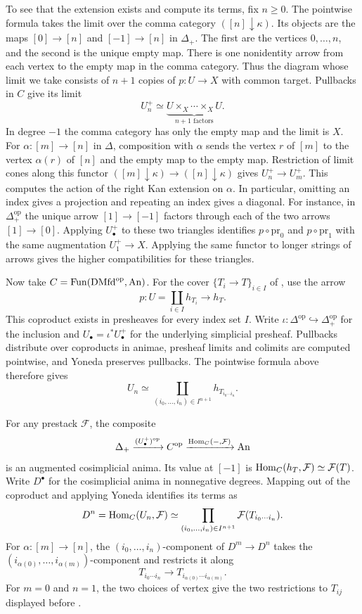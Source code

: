 To see that the extension exists and compute its terms, fix $n\geq0$.
The pointwise formula takes the limit over the comma category
$([n]\downarrow\kappa)$. Its objects are the maps $[0]\to[n]$ and
$[-1]\to[n]$ in $\Delta_+$. The first are the vertices $0,\ldots,n$,
and the second is the unique empty map. There is one nonidentity
arrow from each vertex to the empty map in the comma category.
Thus the diagram whose limit we take consists of $n+1$ copies of
$p\colon U\to X$ with common target. Pullbacks in $C$ give its limit
\[
 U_n^+\simeq\underbrace{U\times_X\cdots\times_X U}_{n+1\text{ factors}}.
\]
In degree $-1$ the comma category has only the empty map and the
limit is $X$. For $\alpha\colon[m]\to[n]$ in $\Delta$, composition
with $\alpha$ sends the vertex $r$ of $[m]$ to the vertex $\alpha(r)$
of $[n]$ and the empty map to the empty map. Restriction of limit
cones along this functor $([m]\downarrow\kappa)\to([n]\downarrow\kappa)$
gives $U_n^+\to U_m^+$. This computes the action of the right Kan
extension on $\alpha$. In particular, omitting an index gives a
projection and repeating an index gives a diagonal. For instance,
in $\Delta_+^{\mathrm{op}}$ the unique arrow $[1]\to[-1]$ factors through
each of the two arrows $[1]\to[0]$. Applying $U^+_\bullet$ to these
two triangles identifies $p\circ\mathrm{pr}_0$ and
$p\circ\mathrm{pr}_1$ with the same augmentation $U_1^+\to X$.
Applying the same functor to longer strings of arrows gives the
higher compatibilities for these triangles.

Now take $C=\operatorname{Fun}(\mathrm{DMfd}^{\mathrm{op}},\operatorname{An})$. For the cover
$\{T_i\to T\}_{i\in I}$ of , use the arrow
\[
 p\colon U=\coprod_{i\in I}h_{T_i}\longrightarrow h_T .
\]
This coproduct exists in presheaves for every index set $I$.
Write $\iota\colon\Delta^{\mathrm{op}}\hookrightarrow\Delta_+^{\mathrm{op}}$
for the inclusion and $U_\bullet=\iota^*U^+_\bullet$ for the underlying
simplicial presheaf. Pullbacks distribute over coproducts in animae,
presheaf limits and colimits are computed pointwise, and Yoneda
preserves pullbacks. The pointwise formula above therefore gives
\[
 U_n\simeq \coprod_{(i_0,\ldots,i_n)\in I^{n+1}}h_{T_{i_0\cdots i_n}}.
\]

For any prestack $\mathcal F$, the composite
\[
 \Delta_+\xrightarrow{(U^+_\bullet)^{\mathrm{op}}}C^{\mathrm{op}}
 \xrightarrow{\operatorname{Hom}_C(-,\mathcal F)}\operatorname{An}
\]
is an augmented cosimplicial anima. Its value at $[-1]$ is
$\operatorname{Hom}_C(h_T,\mathcal F)\simeq\mathcal F(T)$. Write $D^\bullet$ for
the cosimplicial anima in nonnegative degrees. Mapping out of the
coproduct and applying Yoneda identifies its terms as
\[
 D^n=\operatorname{Hom}_C(U_n,\mathcal F)\simeq
 \prod_{(i_0,\ldots,i_n)\in I^{n+1}}\mathcal F(T_{i_0\cdots i_n}).
\]
For $\alpha\colon[m]\to[n]$, the $(i_0,\ldots,i_n)$-component of
$D^m\to D^n$ takes the $(i_{\alpha(0)},\ldots,i_{\alpha(m)})$-component
and restricts it along
\[
 T_{i_0\cdots i_n}\longrightarrow T_{i_{\alpha(0)}\cdots i_{\alpha(m)}}.
\]
For $m=0$ and $n=1$, the two choices of vertex give the two restrictions
to $T_{ij}$ displayed before .

